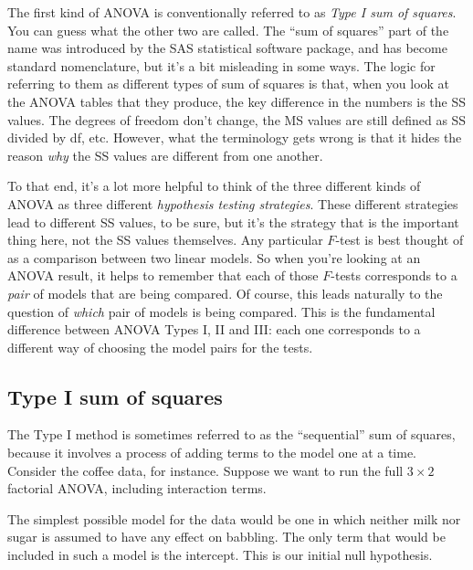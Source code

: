 \documentclass[
  11pt,
  a4paper,
  twoside,symmetric,openright]{book}
\theoremstyle{break}
\theoremstyle{break}
\begin{document}
The first kind of ANOVA is conventionally referred to as \emph{Type I sum of squares}. You can guess what the other two are called. The ``sum of squares'' part of the name was introduced by the SAS statistical software package, and has become standard nomenclature, but it's a bit misleading in some ways. The logic for referring to them as different types of sum of squares is that, when you look at the ANOVA tables that they produce, the key difference in the numbers is the SS values. The degrees of freedom don't change, the MS values are still defined as SS divided by df, etc. However, what the terminology gets wrong is that it hides the reason \emph{why} the SS values are different from one another.

To that end, it's a lot more helpful to think of the three different kinds of ANOVA as three different \emph{hypothesis testing strategies}. These different strategies lead to different SS values, to be sure, but it's the strategy that is the important thing here, not the SS values themselves. Any particular \(F\)-test is best thought of as a comparison between two linear models. So when you're looking at an ANOVA result, it helps to remember that each of those \(F\)-tests corresponds to a \emph{pair} of models that are being compared. Of course, this leads naturally to the question of \emph{which} pair of models is being compared. This is the fundamental difference between ANOVA Types I, II and III: each one corresponds to a different way of choosing the model pairs for the tests.

\subsection{Type I sum of squares}\label{type-i-sum-of-squares}

The Type I method is sometimes referred to as the ``sequential'' sum of squares, because it involves a process of adding terms to the model one at a time. Consider the coffee data, for instance. Suppose we want to run the full \(3 \times 2\) factorial ANOVA, including interaction terms.

The simplest possible model for the data would be one in which neither milk nor sugar is assumed to have any effect on babbling. The only term that would be included in such a model is the intercept. This is our initial null hypothesis.
\end{document}

